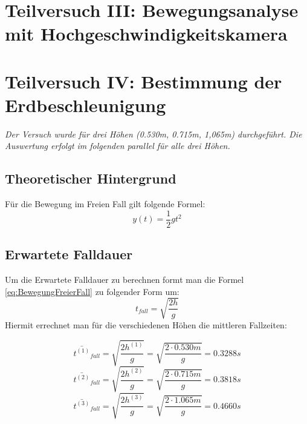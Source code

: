 \documentclass{report}
\begin{document}
\newpage
\section{Teilversuch III: Bewegungsanalyse mit Hochgeschwindigkeitskamera}

\newpage
\section{Teilversuch IV: Bestimmung der Erdbeschleunigung}
    \textit{Der Versuch wurde für drei Höhen (0.530m, 0.715m, 1,065m) durchgeführt. Die Auswertung erfolgt im folgenden parallel für alle drei Höhen.}
    \subsection{Theoretischer Hintergrund}
    Für die Bewegung im Freien Fall gilt folgende Formel:
    \begin{equation}
        y(t) = \frac{1}{2} g t^2
        \label{eq:BewegungFreierFall}
    \end{equation}
    \subsection{Erwartete Falldauer}
    Um die Erwartete Falldauer zu berechnen formt man die Formel \ref{eq:BewegungFreierFall} zu folgender Form um:
    \begin{equation}
        t_{fall} = \sqrt{\frac{2h}{g}}
    \end{equation}
    Hiermit errechnet man für die verschiedenen Höhen die mittleren Fallzeiten:
    
    \begin{equation*}
        \bar{t^{(1)}}_{fall} = \sqrt{\frac{2h^{(1)}}{g}} = \sqrt{\frac{2 \cdot 0.530m}{g}} = 0.3288s
    \end{equation*}
    \begin{equation*}
        \bar{t^{(2)}}_{fall} = \sqrt{\frac{2h^{(2)}}{g}} = \sqrt{\frac{2 \cdot 0.715m}{g}} = 0.3818s
    \end{equation*}
    \begin{equation*}
        \bar{t^{(3)}}_{fall} = \sqrt{\frac{2h^{(3)}}{g}} = \sqrt{\frac{2 \cdot 1.065m}{g}} = 0.4660s
    \end{equation*}
\end{document}
